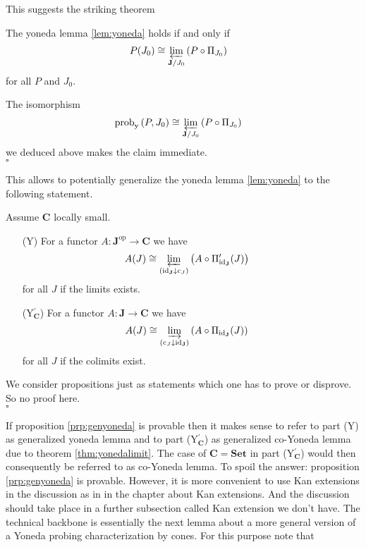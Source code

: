 This suggests the striking theorem
\\
\begin{thm}
\label{thm:yonedalimit}
The yoneda lemma \ref{lem:yoneda} holds if and only if
\begin{align*}
  P(J_{0})
  &\cong
  \varprojlim_{\mathbf{J} \slash J_{0}}
  \left(
    P
    \circ
    \Pi_{J_{0}}
  \right)
\end{align*}
for all $P$ and $J_{0}$.
\end{thm}
\begin{prf}
The isomorphism
\begin{align*}
  \mathrm{prob}_{\mathrm{y}}
  \left(
    P,
    J_{0}
  \right)
  &\cong
  \varprojlim_{\mathbf{J} \slash J_{0}}
  \left(
    P
    \circ
    \Pi_{J_{0}}
  \right)
\end{align*}
we deduced above makes the claim immediate.
\\
\phantom{proven}
\hfill
$\square$
\end{prf}
This allows to potentially generalize the yoneda lemma \ref{lem:yoneda} to the following statement.
\\
\begin{prp}
\label{prp:genyoneda}
Assume $\mathbf{C}$ locally small.
\begin{enumerate}
\item[(Y)]
For a functor $A \colon \mathbf{J}^{\textrm{op}} \to \mathbf{C}$ we have
\begin{align*}
  A(J)
  &\cong
  \varprojlim_{(\mathrm{id}_{\mathbf{J}} \downarrow \mathrm{c}_{J})}
  \left(
    A
    \circ
    \Pi_{\mathrm{id}_{\mathbf{J}}}^{\prime}(J)
  \right)
\end{align*}
for all $J$ if the limits exists.
\item[(Y$_{\mathbf{C}}^{\prime}$)]
For a functor $A \colon \mathbf{J} \to \mathbf{C}$ we have
\begin{align*}
  A(J)
  &\cong
  \varinjlim_{(\mathrm{c}_{J} \downarrow \mathrm{id}_{\mathbf{J}})}
  \left(
    A
    \circ
    \Pi_{\mathrm{id}_{\mathbf{J}}}(J)
  \right)
\end{align*}
for all $J$ if the colimits exist.
\end{enumerate}
\end{prp}
\begin{prf}
We consider propositions just as statements which one has to prove or disprove. So no proof here.
\\
\phantom{proven}
\hfill
$\square$
\end{prf}
If proposition \ref{prp:genyoneda} is provable then it makes sense to refer to part (Y) as generalized yoneda lemma and to part (Y$_{\mathbf{C}}^{\prime}$) as generalized co-Yoneda lemma due to theorem \ref{thm:yonedalimit}. The case of $\mathbf{C} = \mathbf{Set}$ in part (Y$_{\mathbf{C}}^{\prime}$) would then consequently be referred to as co-Yoneda lemma. To spoil the answer: proposition \ref{prp:genyoneda} is provable. However, it is more convenient to use Kan extensions in the discussion as in \cite{52fbba46} in the chapter about Kan extensions. And the discussion should take place in a further subsection called {\glqq}Kan extension{\grqq} we don't have. The technical backbone is essentially the next lemma about a more general version of a Yoneda probing characterization by cones. For this purpose note that
